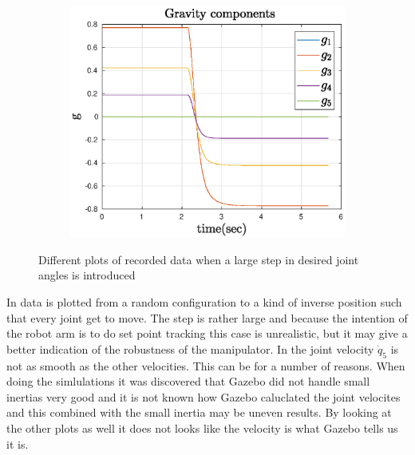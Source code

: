 \begin{figure}[htbp]
    ~
    \begin{subfigure}[htbp]{0.45\textwidth}
        \centering
        \includegraphics[width = \picsSiz\linewidth]{img/LSgrav.eps}
        \caption{ }
    \end{subfigure}
    \caption{Different plots of recorded data when a large step in desired joint angles is introduced}
    \label{fig:LS}
\end{figure}
In  data is plotted from a random configuration to a kind of inverse position such that every joint get to move. The step is rather large and because the intention of the robot arm is to do set point tracking this case is unrealistic, but it may give a better indication of the robustness of the manipulator. In  the joint velocity $\dot{q}_5$ is not as smooth as the other velocities. This can be for a number of reasons. When doing the simlulations it was discovered that Gazebo did not handle small inertias very good and it is not known how Gazebo caluclated the joint velocites and this combined with the small inertia may be uneven results. By looking at the other plots as well it does not looks like the velocity is what Gazebo tells us it is.  


